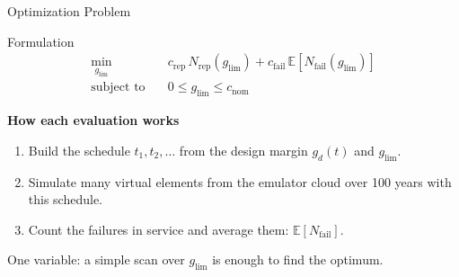 \begin{frame}{Optimization Problem}

\justifying

\begin{exampleblock}{Formulation}
\[
\begin{aligned}
  \min_{g_\mathrm{lim}} \quad & c_\mathrm{rep}\, N_\mathrm{rep}(g_\mathrm{lim})
  + c_\mathrm{fail}\, \mathbb{E}\left[N_\mathrm{fail}(g_\mathrm{lim})\right] \\[6pt]
  \text{subject to} \quad & 0 \le g_\mathrm{lim} \le c_\mathrm{nom}
\end{aligned}
\]
\end{exampleblock}

\vspace{0.3cm}

\textbf{How each evaluation works}
\begin{enumerate}
  \item Build the schedule $t_1, t_2, \dots$ from the design margin $g_d(t)$ and $g_\mathrm{lim}$.
  \item Simulate many virtual elements from the emulator cloud over 100 years with this schedule.
  \item Count the failures in service and average them: $\mathbb{E}[N_\mathrm{fail}]$.
\end{enumerate}

\vspace{0.2cm}

{\small One variable: a simple scan over $g_\mathrm{lim}$ is enough to find the optimum.}

\end{frame}
